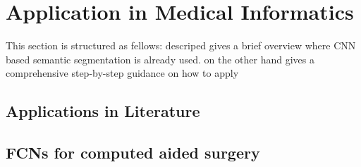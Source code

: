 \section{Application in Medical Informatics}\label{sec:application}

This section is structured as fellows:  descriped gives a brief overview where \gls{CNN} based semantic segmentation is already used.  on the other hand gives a comprehensive step-by-step guidance on how to apply 

\subsection{Applications in Literature} \label{sec:otherapp}



\subsection{FCNs for computed aided surgery} \label{sec:surgery}